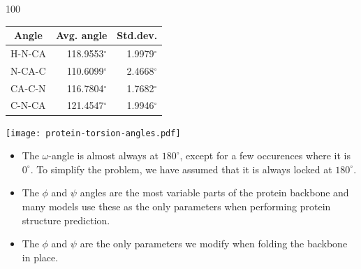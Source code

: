 \documentclass[a0,portrait]{a0poster}
\begin{document}
\begin{GridBlockFill}{0}{46.4}{100}
\begin{multicols}{2}
\begin{minipage}{\linewidth}
\begin{multicols}{2}
\begin{minipage}{\linewidth} 
\centering
  \vspace{7mm}
  \begin{tabular}{lrr}
    \multicolumn{1}{c}{Angle} & \multicolumn{1}{c}{Avg. angle} & \multicolumn{1}{c}{Std.dev.} \\ \midrule 
    H-N-CA & 118.9553$^\circ$ & 1.9979$^\circ$\\
    N-CA-C & 110.6099$^\circ$ & 2.4668$^\circ$\\
    CA-C-N & 116.7804$^\circ$ & 1.7682$^\circ$\\
    C-N-CA & 121.4547$^\circ$ & 1.9946$^\circ$\\
  \end{tabular}
  \vspace{4mm}
  \label{tab:average_bond_angles}
\end{minipage}

   \end{multicols}
\end{minipage}

\pagebreak
    
\begin{minipage}{\linewidth} 
\centering%
\texttt{[image: protein-torsion-angles.pdf]}

% 
\label{fig:torsion_angles}
\end{minipage}

\begin{multicols}{2}
  \begin{itemize}
  \item The $\omega$-angle is almost always at $180^{\circ}$, except
    for a few occurences where it is $0^{\circ}$. To simplify the
    problem, we have assumed that it is always locked at
    $180^{\circ}$.
  \item The $\phi$ and $\psi$ angles are the most variable parts of
    the protein backbone and many models use these as the only
    parameters when performing protein structure prediction.
  \item The $\phi$ and $\psi$ are the only parameters we modify when
    folding the backbone in place.
  \end{itemize}
\end{multicols}
\end{multicols}



\end{GridBlockFill}
\end{document}
